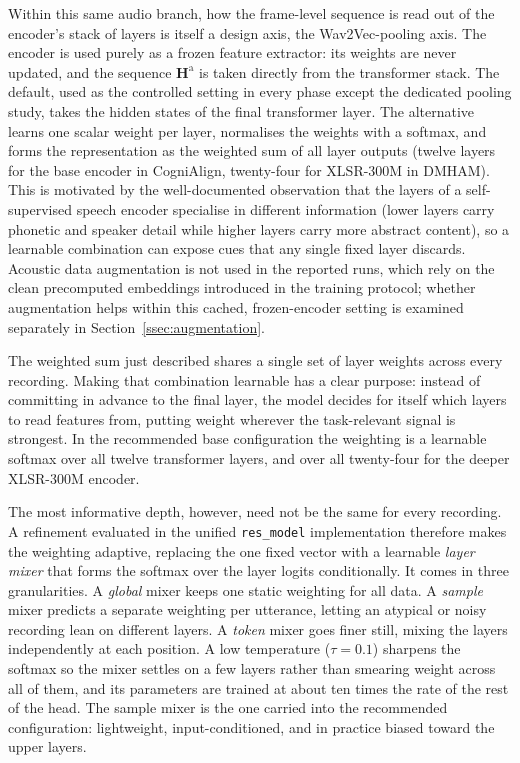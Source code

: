 \documentclass[a4paper,12pt]{article}
\begin{document}
\label{sssec:pooling}
Within this same audio branch, how the frame-level sequence is read out of the encoder's stack of layers is itself a design axis, the Wav2Vec-pooling axis. The encoder is used purely as a frozen feature extractor: its weights are never updated, and the sequence $\mathbf{H}^{\mathrm{a}}$ is taken directly from the transformer stack. The default, used as the controlled setting in every phase except the dedicated pooling study, takes the hidden states of the final transformer layer. The alternative learns one scalar weight per layer, normalises the weights with a softmax, and forms the representation as the weighted sum of all layer outputs (twelve layers for the base encoder in CogniAlign, twenty-four for XLSR-300M in DMHAM). This is motivated by the well-documented observation that the layers of a self-supervised speech encoder specialise in different information (lower layers carry phonetic and speaker detail while higher layers carry more abstract content), so a learnable combination can expose cues that any single fixed layer discards. Acoustic data augmentation is not used in the reported runs, which rely on the clean precomputed embeddings introduced in the training protocol; whether augmentation helps within this cached, frozen-encoder setting is examined separately in Section~\ref{ssec:augmentation}.

The weighted sum just described shares a single set of layer weights across every recording. Making that combination learnable has a clear purpose: instead of committing in advance to the final layer, the model decides for itself which layers to read features from, putting weight wherever the task-relevant signal is strongest. In the recommended base configuration the weighting is a learnable softmax over all twelve transformer layers, and over all twenty-four for the deeper XLSR-300M encoder.

The most informative depth, however, need not be the same for every recording. A refinement evaluated in the unified \texttt{res\_model} implementation therefore makes the weighting adaptive, replacing the one fixed vector with a learnable \emph{layer mixer} that forms the softmax over the layer logits conditionally. It comes in three granularities. A \emph{global} mixer keeps one static weighting for all data. A \emph{sample} mixer predicts a separate weighting per utterance, letting an atypical or noisy recording lean on different layers. A \emph{token} mixer goes finer still, mixing the layers independently at each position. A low temperature ($\tau = 0.1$) sharpens the softmax so the mixer settles on a few layers rather than smearing weight across all of them, and its parameters are trained at about ten times the rate of the rest of the head. The sample mixer is the one carried into the recommended configuration: lightweight, input-conditioned, and in practice biased toward the upper layers.
\end{document}
